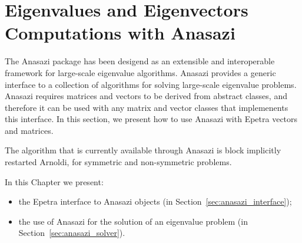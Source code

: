 % 
% 
% 
%   
%   
% 
% 

\section{Eigenvalues and Eigenvectors Computations with Anasazi}
\label{chap:anasazi}

The Anasazi package has been desigend as an extensible and interoperable
framework for large-scale eigenvalue algorithms. Anasazi provides a
generic interface to a collection of algorithms for solving large-scale
eigenvalue problems. Anasazi requires matrices and vectors to be derived
from abstract classes, and therefore it can be used with any matrix and
vector classes that implemenents this interface. In this section, we
present how to use Anasazi with Epetra vectors and matrices.

The algorithm that is currently available through Anasazi is block
implicitly restarted Arnoldi, for symmetric and non-symmetric problems.

In this Chapter we present:
\begin{itemize}
\item the Epetra interface to Anasazi objects (in
  Section~\ref{sec:anasazi_interface});
\item the use of Anasazi for the solution of an eigenvalue problem (in
  Section~\ref{sec:anasazi_solver}).
\end{itemize}

